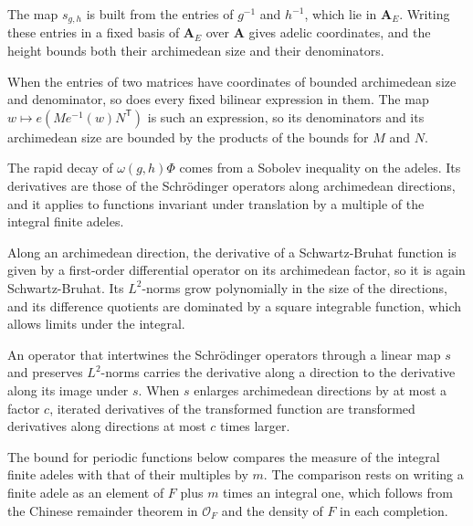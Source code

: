 The map $s_{g,h}$ is built from the entries of $g^{-1}$ and $h^{-1}$, which lie
in $\mathbf A_E$. Writing these entries in a fixed basis of $\mathbf A_E$ over
$\mathbf A$ gives adelic coordinates, and the height bounds both their
archimedean size and their denominators.

When the entries of two matrices have coordinates of bounded archimedean size
and denominator, so does every fixed bilinear expression in them. The map
$w\mapsto e(Me^{-1}(w)N^{\mathsf T})$ is such an expression, so its
denominators and its archimedean size are bounded by the products of the
bounds for $M$ and $N$.

The rapid decay of $\omega(g,h)\Phi$ comes from a Sobolev inequality on the
adeles. Its derivatives are those of the Schrödinger operators along
archimedean directions, and it applies to functions invariant under
translation by a multiple of the integral finite adeles.

Along an archimedean direction, the derivative of a Schwartz-Bruhat function
is given by a first-order differential operator on its archimedean factor, so
it is again Schwartz-Bruhat. Its $L^2$-norms grow polynomially in the size of
the directions, and its difference quotients are dominated by a square
integrable function, which allows limits under the integral.

An operator that intertwines the Schrödinger operators through a linear map
$s$ and preserves $L^2$-norms carries the derivative along a direction to the
derivative along its image under $s$. When $s$ enlarges archimedean directions
by at most a factor $c$, iterated derivatives of the transformed function are
transformed derivatives along directions at most $c$ times larger.

The bound for periodic functions below compares the measure of the integral
finite adeles with that of their multiples by $m$. The comparison rests on
writing a finite adele as an element of $F$ plus $m$ times an integral one,
which follows from the Chinese remainder theorem in $\mathcal O_F$ and the
density of $F$ in each completion.

